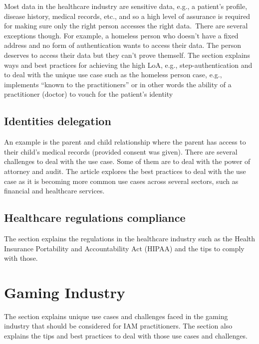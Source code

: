 Most data in the healthcare industry are sensitive data, e.g., a
patient's profile, disease history, medical records, etc., and so a high
level of assurance is required for making sure only the right person
accesses the right data.~There are several exceptions though. For
example, a homeless person who doesn't have a fixed address and no form
of authentication wants to access their data. The person deserves to
access their data but they can't prove themself. The section explains
ways and best practices for achieving the high LoA, e.g.,
step-authentication and to deal with the unique use case such as the
homeless person case, e.g., implements ``known to the practitioners'' or
in other words the ability of a practitioner (doctor) to vouch for the
patient's identity

\hypertarget{identities-delegation}{%
\section{Identities delegation}\label{identities-delegation}}

An example is the parent and child relationship where the parent has
access to their child's medical records (provided consent was given).
There are several challenges to deal with the use case. Some of them are
to deal with the power of attorney and audit. The article explores the
best practices to deal with the use case as it is becoming more common
use cases across several sectors, such as financial and healthcare
services.

\hypertarget{healthcare-regulations-compliance}{%
\section{Healthcare regulations
compliance}\label{healthcare-regulations-compliance}}

The section explains the regulations in the healthcare industry such as
the Health Insurance Portability and Accountability Act (HIPAA) and the
tips to comply with those.

\hypertarget{gaming-industry}{%
\chapter{Gaming Industry}\label{gaming-industry}}

The section explains unique use cases and challenges faced in the gaming
industry that should be considered for IAM practitioners. The section
also explains the tips and best practices to deal with those use cases
and challenges.

